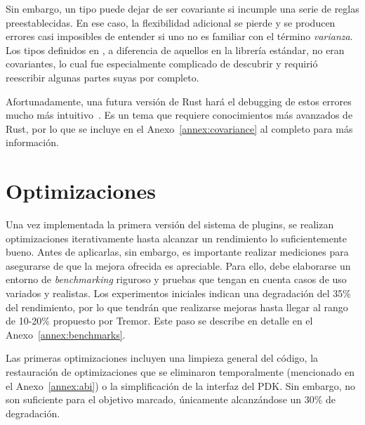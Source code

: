 Sin embargo, un tipo puede dejar de ser covariante si incumple una serie de
reglas preestablecidas. En ese caso, la flexibilidad adicional se pierde y se
producen errores casi imposibles de entender si uno no es familiar con el
término \emph{varianza}. Los tipos definidos en \abistable, a diferencia de
aquellos en la librería estándar, no eran covariantes, lo cual fue especialmente
complicado de descubrir y requirió reescribir algunas partes suyas por completo.

Afortunadamente, una futura versión de Rust hará el debugging de estos errores
mucho más intuitivo~\cite{smarterchecker}. Es un tema que requiere conocimientos
más avanzados de Rust, por lo que se incluye en el Anexo~\ref{annex:covariance}
al completo para más información.

\section{Optimizaciones}

Una vez implementada la primera versión del sistema de plugins, se realizan
optimizaciones iterativamente hasta alcanzar un rendimiento lo suficientemente
bueno. Antes de aplicarlas, sin embargo, es importante realizar mediciones para
asegurarse de que la mejora ofrecida es apreciable. Para ello, debe elaborarse
un entorno de \emph{benchmarking} riguroso y pruebas que tengan en cuenta casos
de uso variados y realistas. Los experimentos iniciales indican una degradación
del 35\% del rendimiento, por lo que tendrán que realizarse mejoras hasta llegar
al rango de 10-20\% propuesto por Tremor. Este paso se describe en detalle en el
Anexo~\ref{annex:benchmarks}.

Las primeras optimizaciones incluyen una limpieza general del código, la
restauración de optimizaciones que se eliminaron temporalmente (mencionado en el
Anexo~\ref{annex:abi}) o la simplificación de la interfaz del PDK. Sin embargo,
no son suficiente para el objetivo marcado, únicamente alcanzándose un 30\% de
degradación.
